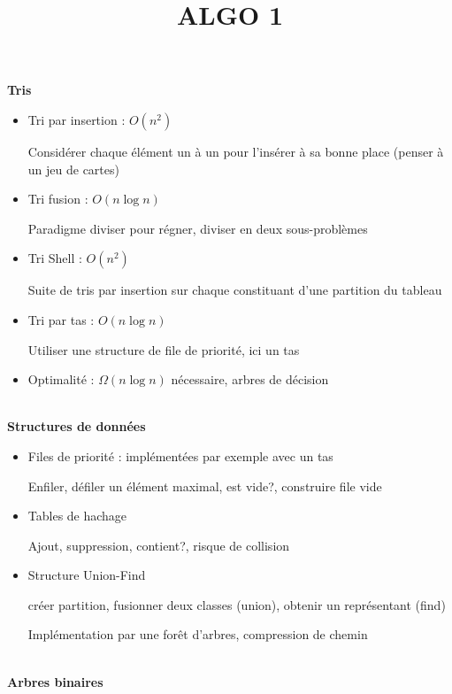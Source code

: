 \documentclass[10pt,a4paper]{article}
\newcommand{\cat}[1]{\noindent \textbf{\Large #1}}
\begin{document}
\title{\textbf{ALGO 1}}
\date{}

\maketitle


\cat{Tris}

%
\begin{itemize}[noitemsep]
	\item Tri par insertion : \(  O(n^2)  \)
		
		Considérer chaque élément un à un pour l'insérer à sa bonne place (penser à un jeu de cartes)
		
	\item Tri fusion : \(  O(n\log n)  \)
		
		Paradigme diviser pour régner, diviser en deux sous-problèmes
	\item Tri Shell : \(  O(n^2)  \)
	
		Suite de tris par insertion sur chaque constituant d'une partition du tableau
		
	\item Tri par tas : \(  O(n\log n)  \)
	
		Utiliser une structure de file de priorité, ici un tas
	\item Optimalité : \(  \Omega (n \log n)  \) nécessaire, arbres de décision
\end{itemize}
%
~ \\


\cat{Structures de données}

%
\begin{itemize}[noitemsep]
	\item Files de priorité : implémentées par exemple avec un tas
	
		Enfiler, défiler un élément maximal, est vide?, construire file vide
	\item Tables de hachage
	
		Ajout, suppression, contient?, risque de collision
	\item Structure Union-Find
	
		créer partition, fusionner deux classes (union), obtenir un représentant (find)
		
		Implémentation par une forêt d'arbres, compression de chemin
\end{itemize}
%
~ \\


\cat{Arbres binaires}
\end{document}
